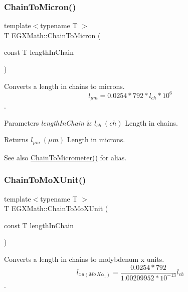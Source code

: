 \subsubsection{\texorpdfstring{Chain\+To\+Micron()}{ChainToMicron()}}
{\footnotesize\ttfamily template$<$typename T $>$ \\
T E\+G\+X\+Math\+::\+Chain\+To\+Micron (\begin{DoxyParamCaption}\item[{const T}]{length\+In\+Chain }\end{DoxyParamCaption})}



Converts a length in chains to microns. \[ l_{\mu m}=0.0254 * 792 * l_{ch} * 10^{6} \]. 


\begin{DoxyParams}{Parameters}
{\em length\+In\+Chain} & $ l_{ch}\ (ch)$ Length in chains. \\
\hline
\end{DoxyParams}
\begin{DoxyReturn}{Returns}
$ l_{\mu m}\ (\mu m)$ Length in microns. 
\end{DoxyReturn}
\begin{DoxySeeAlso}{See also}
\mbox{\hyperlink{group___e_g_x_math-_conversions-_length_conversions-_imperial-_chain-_s_i_gab6d1ab0738e0a31f328352569fa00767}{Chain\+To\+Micrometer()}} for alias. 
\end{DoxySeeAlso}
\mbox{\label{group___e_g_x_math-_conversions-_length_conversions-_imperial-_chain-_non-_s_i_gae4a2b99d846db53416e9fc5d6f9e957c}} 
\subsubsection{\texorpdfstring{Chain\+To\+Mo\+X\+Unit()}{ChainToMoXUnit()}}
{\footnotesize\ttfamily template$<$typename T $>$ \\
T E\+G\+X\+Math\+::\+Chain\+To\+Mo\+X\+Unit (\begin{DoxyParamCaption}\item[{const T}]{length\+In\+Chain }\end{DoxyParamCaption})}



Converts a length in chains to molybdenum x units. \[ l_{xu(Mo\ K\alpha_1)}=\frac{0.0254 * 792}{1.00209952*10^{-13}} l_{ch}\]. 


